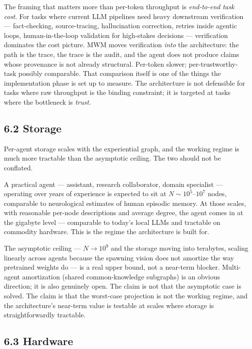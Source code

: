 \documentclass[12pt]{article}
\begin{document}
The framing that matters more than per-token throughput is \emph{end-to-end task cost}. For tasks where current LLM pipelines need heavy downstream verification --- fact-checking, source-tracing, hallucination correction, retries inside agentic loops, human-in-the-loop validation for high-stakes decisions --- verification dominates the cost picture. MWM moves verification \emph{into} the architecture: the path is the trace, the trace is the audit, and the agent does not produce claims whose provenance is not already structural. Per-token slower; per-trustworthy-task possibly comparable. That comparison itself is one of the things the implementation phase is set up to measure. The architecture is not defensible for tasks where raw throughput is the binding constraint; it is targeted at tasks where the bottleneck is \emph{trust}.

\subsection{6.2 Storage}\label{storage}

Per-agent storage scales with the experiential graph, and the working regime is much more tractable than the asymptotic ceiling. The two should not be conflated.

A practical agent --- assistant, research collaborator, domain specialist --- operating over years of experience is expected to sit at \(N \sim 10^5\)--\(10^7\) nodes, comparable to neurological estimates of human episodic memory. At those scales, with reasonable per-node descriptions and average degree, the agent comes in at the gigabyte level --- comparable to today's local LLMs and tractable on commodity hardware. This is the regime the architecture is built for.

The asymptotic ceiling --- \(N \to 10^9\) and the storage moving into terabytes, scaling linearly across agents because the spawning vision does not amortize the way pretrained weights do --- is a real upper bound, not a near-term blocker. Multi-agent amortization (shared common-knowledge subgraphs) is an obvious direction; it is also genuinely open. The claim is not that the asymptotic case is solved. The claim is that the worst-case projection is not the working regime, and the architecture's near-term value is testable at scales where storage is straightforwardly tractable.

\subsection{6.3 Hardware}\label{hardware}
\end{document}

